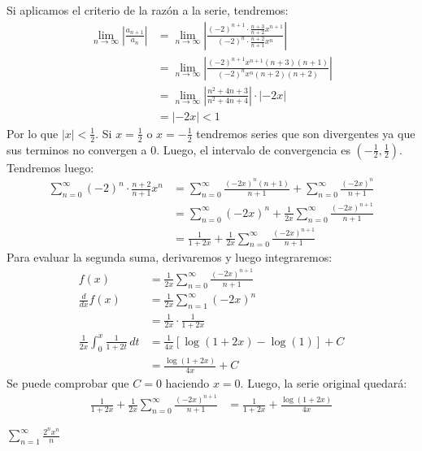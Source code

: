 \documentclass[../main.tex]{subfiles}
\begin{document}
Si aplicamos el criterio de la razón a la serie, tendremos:
\begin{align*}
    \lim_{n \to \infty} \left|\frac{a_{n+1}}{a_n}\right| &= \lim_{n \to \infty} \left|\frac{(-2)^{n+1} \cdot \frac{n+3}{n+2} x^{n+1}}{(-2)^n \cdot \frac{n+2}{n+1} x^n}\right|\\
    &= \lim_{n \to \infty} \left|\frac{(-2)^{n+1} x^{n+1} (n+3)(n+1)}{(-2)^n x^n (n+2)(n+2)}\right|\\
    &= \lim_{n \to \infty} \left|\frac{n^2+4n+3}{n^2+4n+4}\right| \cdot |-2x|\\
    &= |-2x| < 1
\end{align*}
Por lo que $|x| < \frac{1}{2}$. Si $x = \frac{1}{2}$ o $x = -\frac{1}{2}$ tendremos series que son divergentes ya que sus terminos no convergen a $0$. Luego, el intervalo de convergencia es $\left(-\frac{1}{2}, \frac{1}{2}\right)$. Tendremos luego:
\begin{align*}
    \sum\limits_{n = 0}^\infty (-2)^n \cdot \frac{n+2}{n+1} x^n &= \sum\limits_{n = 0}^\infty \frac{(-2x)^n (n+1)}{n+1} + \sum\limits_{n = 0}^\infty \frac{(-2x)^n}{n+1}\\
    &= \sum_{n = 0}^\infty (-2x)^n + \frac{1}{2x} \sum\limits_{n = 0}^\infty \frac{(-2x)^{n+1}}{n+1}\\
    &= \frac{1}{1+2x} + \frac{1}{2x}\sum\limits_{n = 0}^\infty \frac{(-2x)^{n+1}}{n+1}
\end{align*}
Para evaluar la segunda suma, derivaremos y luego integraremos:
\begin{align*}
    f(x) &= \frac{1}{2x}\sum\limits_{n = 0}^\infty \frac{(-2x)^{n+1}}{n+1}\\
    \frac{d}{dx} f(x) &= \frac{1}{2x} \sum_{n = 1}^\infty (-2x)^n\\
    &= \frac{1}{2x} \cdot \frac{1}{1+2x}\\
    \frac{1}{2x} \int_{0}^x \frac{1}{1+2t} \, dt &= \frac{1}{4x} \left[\log(1+2x) - \log(1)\right] + C\\
    &= \frac{\log(1+2x)}{4x} + C
\end{align*}
Se puede comprobar que $C=0$ haciendo $x=0$. Luego, la serie original quedará:
\begin{align*}
    \frac{1}{1+2x} + \frac{1}{2x}\sum\limits_{n = 0}^\infty \frac{(-2x)^{n+1}}{n+1} &= \frac{1}{1+2x} + \frac{\log(1+2x)}{4x}
\end{align*}

\question $\sum\limits_{n = 1}^\infty \frac{2^n x^n}{n}$\\
\end{document}
